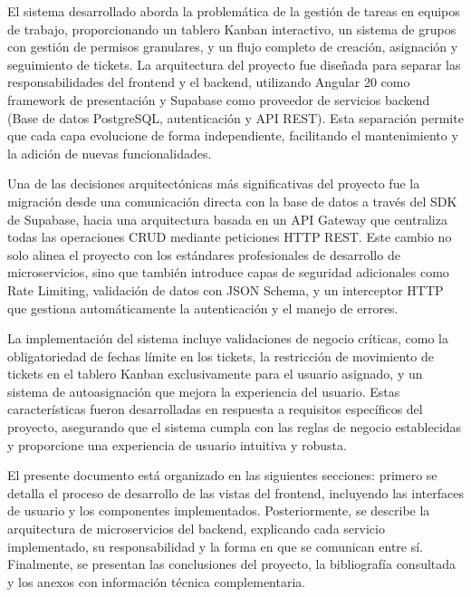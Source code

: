 \documentclass[12pt,a4paper]{article}
\begin{document}
El sistema desarrollado aborda la problemática de la gestión de tareas en equipos de trabajo, proporcionando un tablero Kanban interactivo, un sistema de grupos con gestión de permisos granulares, y un flujo completo de creación, asignación y seguimiento de tickets. La arquitectura del proyecto fue diseñada para separar las responsabilidades del frontend y el backend, utilizando Angular 20 como framework de presentación y Supabase como proveedor de servicios backend (Base de datos PostgreSQL, autenticación y API REST). Esta separación permite que cada capa evolucione de forma independiente, facilitando el mantenimiento y la adición de nuevas funcionalidades.

Una de las decisiones arquitectónicas más significativas del proyecto fue la migración desde una comunicación directa con la base de datos a través del SDK de Supabase, hacia una arquitectura basada en un API Gateway que centraliza todas las operaciones CRUD mediante peticiones HTTP REST. Este cambio no solo alinea el proyecto con los estándares profesionales de desarrollo de microservicios, sino que también introduce capas de seguridad adicionales como Rate Limiting, validación de datos con JSON Schema, y un interceptor HTTP que gestiona automáticamente la autenticación y el manejo de errores.

La implementación del sistema incluye validaciones de negocio críticas, como la obligatoriedad de fechas límite en los tickets, la restricción de movimiento de tickets en el tablero Kanban exclusivamente para el usuario asignado, y un sistema de autoasignación que mejora la experiencia del usuario. Estas características fueron desarrolladas en respuesta a requisitos específicos del proyecto, asegurando que el sistema cumpla con las reglas de negocio establecidas y proporcione una experiencia de usuario intuitiva y robusta.

El presente documento está organizado en las siguientes secciones: primero se detalla el proceso de desarrollo de las vistas del frontend, incluyendo las interfaces de usuario y los componentes implementados. Posteriormente, se describe la arquitectura de microservicios del backend, explicando cada servicio implementado, su responsabilidad y la forma en que se comunican entre sí. Finalmente, se presentan las conclusiones del proyecto, la bibliografía consultada y los anexos con información técnica complementaria.

\end{document}
